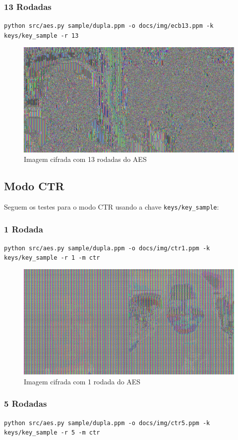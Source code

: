 \documentclass[12pt]{article}
\begin{document}
\subsubsection{13 Rodadas}

\texttt{python src/aes.py sample/dupla.ppm -o docs/img/ecb13.ppm -k keys/key\_sample -r 13}

\begin{figure}[H]
	\centering
    \includegraphics[width=.5\textwidth]{img/ecb13.jpg}
    \caption{Imagem cifrada com 13 rodadas do AES}
\end{figure}

\subsection{Modo CTR}

Seguem os testes para o modo CTR usando a chave \texttt{keys/key\_sample}:

\subsubsection{1 Rodada}

\texttt{python src/aes.py sample/dupla.ppm -o docs/img/ctr1.ppm -k keys/key\_sample -r 1 -m ctr}

\begin{figure}[H]
	\centering
    \includegraphics[width=.5\textwidth]{img/ctr1.jpg}
    \caption{Imagem cifrada com 1 rodada do AES}
\end{figure}

\subsubsection{5 Rodadas}

\texttt{python src/aes.py sample/dupla.ppm -o docs/img/ctr5.ppm -k keys/key\_sample -r 5 -m ctr}
\end{document}
